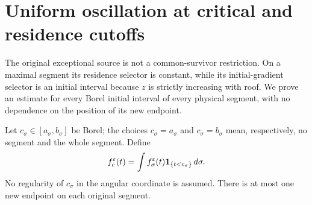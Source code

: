 \section{Uniform oscillation at critical and residence cutoffs}
\label{sec:v90-prefix}
The original exceptional source is not a common-survivor restriction.
On a maximal segment its residence selector is constant, while its
initial-gradient selector is an initial interval because $z$ is strictly
increasing with roof. We prove an estimate for every Borel initial
interval of every physical segment, with no dependence on the position
of its new endpoint.

Let $c_\sigma\in[a_\sigma,b_\sigma]$ be Borel; the choices
$c_\sigma=a_\sigma$ and $c_\sigma=b_\sigma$ mean, respectively,
no segment and the whole segment. Define
\begin{equation}\label{eq:v90-prefix-source}
 f_c^\varepsilon(t)=\int f_\sigma^\varepsilon(t)
                                  \one_{\{t<c_\sigma\}}\,d\sigma.
\end{equation}
No regularity of $c_\sigma$ in the angular coordinate is assumed.
There is at most one new endpoint on each original segment.

